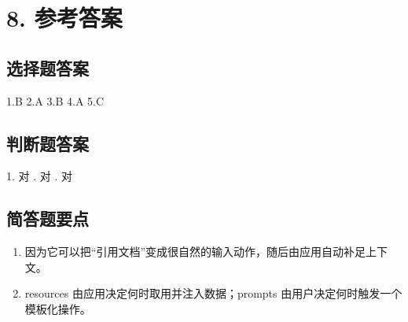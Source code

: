 \documentclass[UTF8,a4paper,11pt]{ctexart}
\begin{document}
\section*{8. 参考答案}
\subsection*{选择题答案}
1.B \quad 2.A \quad 3.B \quad 4.A \quad 5.C

\subsection*{判断题答案}
1. 对 . 对 . 对

\subsection*{简答题要点}
\begin{enumerate}
  \item 因为它可以把“引用文档”变成很自然的输入动作，随后由应用自动补足上下文。
  \item resources 由应用决定何时取用并注入数据；prompts 由用户决定何时触发一个模板化操作。
\end{enumerate}
\end{document}
